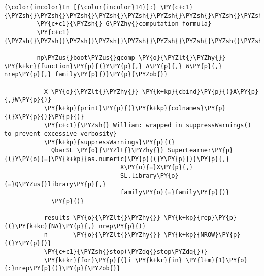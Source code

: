    \begin{Verbatim}[commandchars=\\\{\}]
{\color{incolor}In [{\color{incolor}14}]:} \PY{c+c1}{\PYZsh{}\PYZsh{}\PYZsh{}\PYZsh{}\PYZsh{}\PYZsh{}\PYZsh{}\PYZsh{}\PYZsh{}\PYZsh{}\PYZsh{}\PYZsh{}\PYZsh{}\PYZsh{}\PYZsh{}\PYZsh{}\PYZsh{}\PYZsh{}\PYZsh{}\PYZsh{}\PYZsh{}\PYZsh{}\PYZsh{}\PYZsh{}\PYZsh{}\PYZsh{}\PYZsh{}\PYZsh{}\PYZsh{}\PYZsh{}\PYZsh{}\PYZsh{}\PYZsh{}\PYZsh{}\PYZsh{}\PYZsh{}\PYZsh{}\PYZsh{}\PYZsh{}\PYZsh{}\PYZsh{}\PYZsh{}\PYZsh{}\PYZsh{}\PYZsh{}\PYZsh{}\PYZsh{}\PYZsh{}\PYZsh{}\PYZsh{}\PYZsh{}\PYZsh{}\PYZsh{}\PYZsh{}\PYZsh{}\PYZsh{}\PYZsh{}\PYZsh{}\PYZsh{}\PYZsh{}\PYZsh{}}
         \PY{c+c1}{\PYZsh{} G\PYZhy{}computation formula}
         \PY{c+c1}{\PYZsh{}\PYZsh{}\PYZsh{}\PYZsh{}\PYZsh{}\PYZsh{}\PYZsh{}\PYZsh{}\PYZsh{}\PYZsh{}\PYZsh{}\PYZsh{}\PYZsh{}\PYZsh{}\PYZsh{}\PYZsh{}\PYZsh{}\PYZsh{}\PYZsh{}\PYZsh{}\PYZsh{}\PYZsh{}\PYZsh{}\PYZsh{}\PYZsh{}\PYZsh{}\PYZsh{}\PYZsh{}\PYZsh{}\PYZsh{}\PYZsh{}\PYZsh{}\PYZsh{}\PYZsh{}\PYZsh{}\PYZsh{}\PYZsh{}\PYZsh{}\PYZsh{}\PYZsh{}\PYZsh{}\PYZsh{}\PYZsh{}\PYZsh{}\PYZsh{}\PYZsh{}\PYZsh{}\PYZsh{}\PYZsh{}\PYZsh{}\PYZsh{}\PYZsh{}\PYZsh{}\PYZsh{}\PYZsh{}\PYZsh{}\PYZsh{}\PYZsh{}\PYZsh{}\PYZsh{}\PYZsh{}}
         
         np\PYZus{}boot\PYZus{}gcomp \PY{o}{\PYZlt{}\PYZhy{}} \PY{k+kr}{function}\PY{p}{(}Y\PY{p}{,} A\PY{p}{,} W\PY{p}{,} nrep\PY{p}{,} family\PY{p}{)}\PY{p}{\PYZob{}}
             
           X \PY{o}{\PYZlt{}\PYZhy{}} \PY{k+kp}{cbind}\PY{p}{(}A\PY{p}{,}W\PY{p}{)}
           \PY{k+kp}{print}\PY{p}{(}\PY{k+kp}{colnames}\PY{p}{(}X\PY{p}{)}\PY{p}{)}
           \PY{c+c1}{\PYZsh{} William: wrapped in suppressWarnings() to prevent excessive verbosity}
           \PY{k+kp}{suppressWarnings}\PY{p}{(}
             QbarSL \PY{o}{\PYZlt{}\PYZhy{}} SuperLearner\PY{p}{(}Y\PY{o}{=}\PY{k+kp}{as.numeric}\PY{p}{(}Y\PY{p}{)}\PY{p}{,}
                                X\PY{o}{=}X\PY{p}{,}
                                SL.library\PY{o}{=}Q\PYZus{}library\PY{p}{,}
                                family\PY{o}{=}family\PY{p}{)}
             \PY{p}{)} 
             
           results \PY{o}{\PYZlt{}\PYZhy{}} \PY{k+kp}{rep}\PY{p}{(}\PY{k+kc}{NA}\PY{p}{,} nrep\PY{p}{)}
           n       \PY{o}{\PYZlt{}\PYZhy{}} \PY{k+kp}{NROW}\PY{p}{(}Y\PY{p}{)}
           \PY{c+c1}{\PYZsh{}stop(\PYZdq{}stop\PYZdq{})}
           \PY{k+kr}{for}\PY{p}{(}i \PY{k+kr}{in} \PY{l+m}{1}\PY{o}{:}nrep\PY{p}{)}\PY{p}{\PYZob{}}
               

\end{Verbatim}
